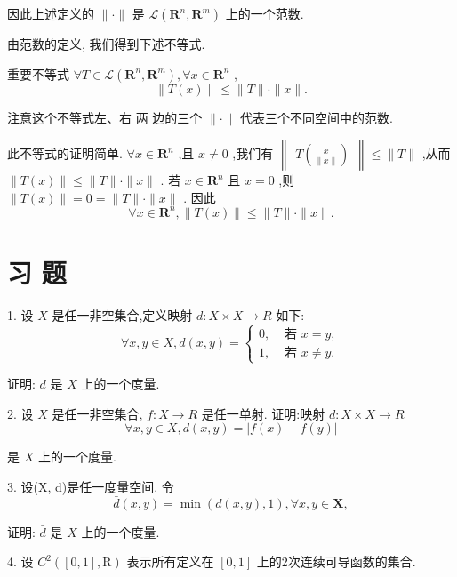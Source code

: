 因此上述定义的 $\parallel  \cdot  \parallel$ 是 $\mathcal{L}\left( {{\mathbf{R}}^{n},{\mathbf{R}}^{m}}\right)$ 上的一个范数.

由范数的定义, 我们得到下述不等式.

重要不等式 $\forall T \in  \mathcal{L}\left( {{\mathbf{R}}^{n},{\mathbf{R}}^{m}}\right) ,\forall x \in  {\mathbf{R}}^{n}$ ,
$$\parallel T\left( x\right) \parallel  \leq  \parallel T\parallel  \cdot  \parallel x\parallel .$$

注意这个不等式左、右 两 边的三个 $\parallel  \cdot  \parallel$ 代表三个不同空间中的范数.

此不等式的证明简单. $\forall x \in  {\mathbf{R}}^{n}$ ,且 $x \neq  0$ ,我们有 $\begin{Vmatrix}{T\left( \frac{x}{\parallel x\parallel }\right) }\end{Vmatrix} \leq  \parallel T\parallel$ ,从而 $\parallel T\left( x\right) \parallel  \leq  \parallel T\parallel  \cdot  \parallel x\parallel$ . 若 $x \in  {\mathbf{R}}^{n}$ 且 $x = 0$ ,则 $\parallel T\left( x\right) \parallel  = 0 = \parallel T\parallel  \cdot  \parallel x\parallel$ . 因此
$$\forall x \in  {\mathbf{R}}^{n},\parallel T\left( x\right) \parallel  \leq  \parallel T\parallel  \cdot  \parallel x\parallel .$$

\section*{习 题}

1. 设 $X$ 是任一非空集合,定义映射 $d : X \times  X \rightarrow  R$ 如下:
$$\forall x,y \in  X,d\left( {x,y}\right)  = \left\{  \begin{array}{ll} 0, & \text{ 若 }x = y, \\  1, & \text{ 若 }x \neq  y. \end{array}\right.$$

证明: $d$ 是 $X$ 上的一个度量.

2. 设 $X$ 是任一非空集合, $f : X \rightarrow  R$ 是任一单射. 证明:映射 $d : X \times  X \rightarrow  R$
$$\forall x,y \in  X,d\left( {x,y}\right)  = \left| {f\left( x\right)  - f\left( y\right) }\right|$$

是 $X$ 上的一个度量.

3. 设(X, d)是任一度量空间. 令
$$\bar{d}\left( {x,y}\right)  = \min \left( {d\left( {x,y}\right) ,1}\right) ,\forall x,y \in  \mathbf{X},$$

证明: $\bar{d}$ 是 $X$ 上的一个度量.

4. 设 ${C}^{2}\left( {\left\lbrack  {0,1}\right\rbrack  ,\mathrm{R}}\right)$ 表示所有定义在 $\left\lbrack  {0,1}\right\rbrack$ 上的2次连续可导函数的集合.

